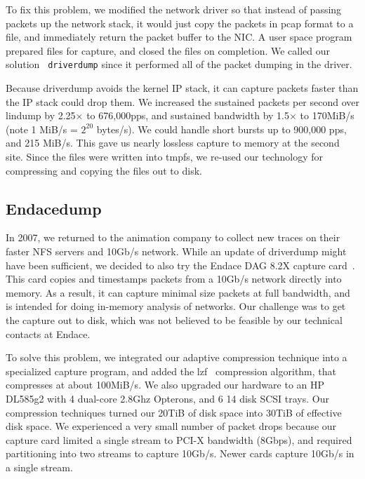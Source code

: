 To fix this problem, we modified the network driver so that instead of
passing packets up the network stack, it would just copy the packets
in pcap format to a file, and immediately return the packet
buffer to the NIC.  A user space program prepared files for capture,
and closed the files on completion.  We called our solution {\tt
driverdump} since it performed all of the packet dumping in the
driver.

Because driverdump avoids the kernel IP stack, it can
capture packets faster than the IP stack could drop them.
We increased the sustained packets per second over lindump by 2.25$\times$ to
676,000pps, and sustained bandwidth by 1.5$\times$ to 170MiB/s (note 1 MiB/s = $2^{20}$ bytes/s).  We could
handle short bursts up to 900,000 pps, and 215 MiB/s.  This gave us
nearly lossless capture to memory at the second site.  Since the files
were written into tmpfs, we re-used our technology for compressing and
copying the files out to disk.

\subsection{Endacedump}

In 2007, we returned to the animation company to collect new traces on
their faster NFS servers and 10Gb/s network.  While an update of
driverdump might have been sufficient, we decided to also try the
Endace DAG 8.2X capture card~\cite{endace-cards}.  This card copies
and timestamps packets from a 10Gb/s network directly into memory.  As
a result, it can capture minimal size packets at full bandwidth, and
is intended for doing in-memory analysis of networks.  Our challenge
was to get the capture out to disk, which was not believed to be
feasible by our technical contacts at Endace.

To solve this problem, we integrated our adaptive compression
technique into a specialized capture program, and added the
lzf~\cite{lzf} compression algorithm, that compresses at about
100MiB/s.  We also upgraded our hardware to an HP DL585g2 with 4 
dual-core 2.8Ghz Opterons, and 6 14 disk SCSI trays.  Our compression
techniques turned our 20TiB of disk space into 30TiB of effective disk
space.  We experienced a very small number of packet drops because our
capture card limited a single stream to PCI-X bandwidth (8Gbps), and
required partitioning into two streams to capture 10Gb/s.  Newer cards
capture 10Gb/s in a single stream.


